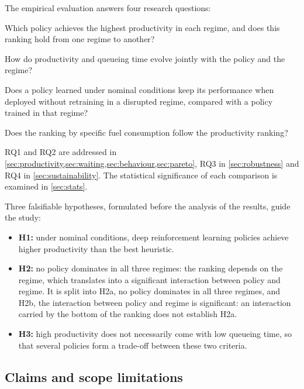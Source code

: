 \documentclass[11pt,a4paper]{article}
\newif\ifrevmarks
\newcommand{\revtag}[1]{\ifrevmarks\textsuperscript{\textcolor{red!70!black}{\scriptsize[#1]}}\fi}
\newenvironment{revbloc}[1]{\par\ifrevmarks\color{revcolor}\noindent\revtag{#1}\ \fi}{\par}
\newif\ifcorrmarks
\newcommand{\corr}[1]{\ifcorrmarks\textcolor{corrcolor}{#1}\else#1\fi}
\begin{document}
\begin{revbloc}{M23}
The empirical evaluation answers four research questions:

\begin{description}[leftmargin=1.2cm,labelwidth=1.0cm]
  \item[RQ1] Which policy achieves the highest productivity in each regime, and does this ranking hold from one regime to another?
  \item[RQ2] How do productivity and queueing time evolve jointly with the policy and the regime?
  \item[RQ3] Does a policy learned under nominal conditions keep its performance when deployed without retraining in a disrupted regime, compared with a policy trained in that regime?
  \item[RQ4] Does the ranking by specific fuel consumption follow the productivity ranking?
\end{description}

RQ1 and RQ2 are addressed in \cref{sec:productivity,sec:waiting,sec:behaviour,sec:pareto}, RQ3 in \cref{sec:robustness} and RQ4 in \cref{sec:sustainability}. The statistical significance of each comparison is examined in \cref{sec:stats}.

Three falsifiable hypotheses, formulated before the analysis of the results, guide the study:

\begin{itemize}
  \item \textbf{H1:} under nominal conditions, deep reinforcement learning policies achieve higher productivity than the best heuristic.
  \item \textbf{H2:} no policy dominates in all three regimes: the ranking depends on the regime, which translates into a significant interaction between policy and regime. \corr{It is split into H2a, no policy dominates in all three regimes, and H2b, the interaction between policy and regime is significant: an interaction carried by the bottom of the ranking does not establish H2a.}
  \item \textbf{H3:} high productivity does not necessarily come with low queueing time, so that several policies form a trade-off between these two criteria.
\end{itemize}
\end{revbloc}

\subsection{Claims and scope limitations}
\end{document}
